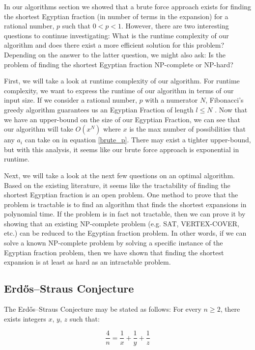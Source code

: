 \documentclass[paper=a4, fontsize=11pt]{scrartcl}
\numberwithin{equation}{section}	 %
\numberwithin{figure}{section}	 %
\numberwithin{table}{section}	 %
\begin{document}
In our algorithms section we showed that a brute force approach exists for finding the shortest Egyptian fraction (in number of terms in the expansion) for a rational number, $p$ such that $0 < p < 1$. However, there are two interesting questions to continue investigating: What is the runtime complexity of our algorithm and does there exist a more efficient solution for this problem? Depending on the answer to the latter question, we might also ask: Is the problem of finding the shortest Egyptian fraction NP-complete or NP-hard?

First, we will take a look at runtime complexity of our algorithm. For runtime complexity, we want to express the runtime of our algorithm in terms of our input size. If we consider a rational number, $p$ with a numerator $N$, Fibonacci’s greedy algorithm guarantees us an Egyptian Fraction of length $l \leq N$ \cite{graham}. Now that we have an upper-bound on the size of our Egyptian Fraction, we can see that our algorithm will take $O(x^N)$ where $x$ is the max number of possibilities that any $a_i$ can take on in equation \ref{brute_p}. There may exist a tighter upper-bound, but with this analysis, it seems like our brute force approach is exponential in runtime.

Next, we will take a look at the next few questions on an optimal algorithm. Based on the existing literature, it seems like the tractability of finding the shortest Egyptian fraction is an open problem. One method to prove that the problem is tractable is to find an algorithm that finds the shortest expansions in polynomial time. If the problem is in fact not tractable, then we can prove it by showing that an existing NP-complete problem (e.g. \textsc{SAT}, \textsc{VERTEX-COVER}, etc.) can be reduced to the Egyptian fraction problem. In other words, if we can solve a known NP-complete problem by solving a specific instance of the Egyptian fraction problem, then we have shown that finding the shortest expansion is at least as hard as an intractable problem.

\subsection{Erd\H{o}s–Straus Conjecture}
The Erd\H{o}s–Straus Conjecture may be stated as follows:
For every $n \geq 2$, there exists integers $x$, $y$, $z$ such that:

\begin{equation}\label{erdos}
	\frac{4}{n} = \frac{1}{x} + \frac{1}{y} + \frac{1}{z}
\end{equation}
\end{document}
